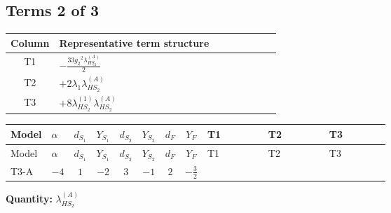 \documentclass[8pt]{article}
\begin{document}
\begin{landscape}
\subsection*{Terms 2 of 3}
\begin{center}
\begin{tabular}{@{}c >{\raggedright\arraybackslash}p{0.82\linewidth}@{}}
\toprule
Column & Representative term structure \\
\midrule
T1 & \(\displaystyle -\frac{33 {g_2}^2 {\lambda_{HS_2}^{(A)}}}{2}\) \\
\midrule
T2 & \(\displaystyle +2 {\lambda_1} {\lambda_{HS_2}^{(A)}}\) \\
\midrule
T3 & \(\displaystyle +8 {\lambda_{HS_2}^{(1)}} {\lambda_{HS_2}^{(A)}}\) \\
\midrule
\bottomrule
\end{tabular}
\end{center}
\smallskip
\tiny
\begin{longtable}{@{}llcccccc >{\raggedright\arraybackslash}p{0.21\linewidth} >{\raggedright\arraybackslash}p{0.21\linewidth} >{\raggedright\arraybackslash}p{0.21\linewidth}@{}}
\toprule
Model & $\alpha$ & $d_{S_1}$ & $Y_{S_1}$ & $d_{S_2}$ & $Y_{S_2}$ & $d_F$ & $Y_F$ & T1 & T2 & T3 \\
\midrule
\endfirsthead
\toprule
Model & $\alpha$ & $d_{S_1}$ & $Y_{S_1}$ & $d_{S_2}$ & $Y_{S_2}$ & $d_F$ & $Y_F$ & T1 & T2 & T3 \\
\midrule
\endhead
T3-A & $-4$ & $1$ & $-2$ & $3$ & $-1$ & $2$ & $-\frac{3}{2}$ & \scriptsize\adjustbox{max width=\linewidth}{$\begin{gathered} -\frac{33 {g_2}^2 {\lambda_{HS_2}^{(A)}}}{2}\end{gathered}$} & \scriptsize\adjustbox{max width=\linewidth}{$\begin{gathered} +2 {\lambda_1} {\lambda_{HS_2}^{(A)}}\end{gathered}$} & \scriptsize\adjustbox{max width=\linewidth}{$\begin{gathered} +8 {\lambda_{HS_2}^{(1)}} {\lambda_{HS_2}^{(A)}}\end{gathered}$} \\
\midrule
\bottomrule
\end{longtable}
\clearpage
\noindent\textbf{Quantity: }$\lambda_{HS_2}^{(A)}$\par\smallskip

\end{landscape}
\end{document}

